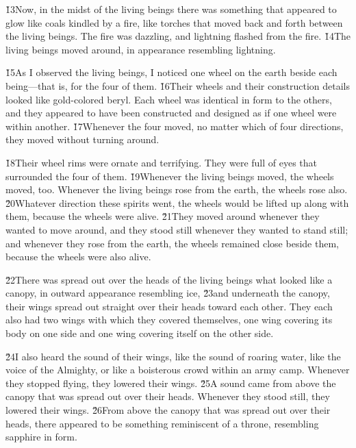 \v{13}Now, in the midst of the living beings there was something that appeared to glow like coals kindled by a fire, like torches that moved back and forth between the living beings. The fire was dazzling, and lightning flashed from the fire. \v{14}The living beings moved around, in appearance resembling lightning.

\v{15}As I observed the living beings, I noticed one wheel on the earth beside each being---that is, for the four of them. \v{16}Their wheels and their construction details looked like gold-colored beryl. Each wheel was identical in form to the others, and they appeared to have been constructed and designed as if one wheel were within another. \v{17}Whenever the four moved, no matter which of four directions, they moved without turning around.

\v{18}Their wheel rims were ornate and terrifying. They were full of eyes that surrounded the four of them. \v{19}Whenever the living beings moved, the wheels moved, too. Whenever the living beings rose from the earth, the wheels rose also. \v{20}Whatever direction these spirits went, the wheels would be lifted up along with them, because the wheels were alive. \v{21}They moved around whenever they wanted to move around, and they stood still whenever they wanted to stand still; and whenever they rose from the earth, the wheels remained close beside them, because the wheels were also alive.

\v{22}There was spread out over the heads of the living beings what looked like a canopy, in outward appearance resembling ice, \v{23}and underneath the canopy, their wings spread out straight over their heads toward each other. They each also had two wings with which they covered themselves, one wing covering its body on one side and one wing covering itself on the other side.

\v{24}I also heard the sound of their wings, like the sound of roaring water, like the voice of the Almighty, or like a boisterous crowd within an army camp. Whenever they stopped flying, they lowered their wings. \v{25}A sound came from above the canopy that was spread out over their heads. Whenever they stood still, they lowered their wings. \v{26}From above the canopy that was spread out over their heads, there appeared to be something reminiscent of a throne, resembling sapphire in form.


